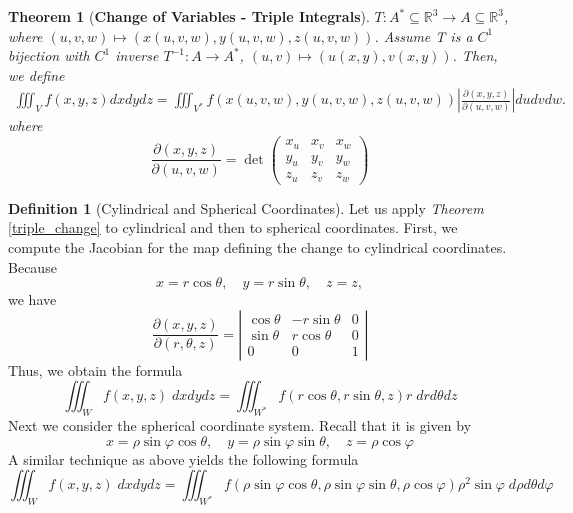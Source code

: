 \documentclass[12pt]{book}
\newtheorem{theorem}{Theorem}[section]
\theoremstyle{definition}
\newtheorem{definition}{Definition}[section]
\theoremstyle{remark}
\begin{document}
  \begin{theorem}[\textbf{Change of Variables - Triple Integrals}] \label{triple_change}
    $T: A^* \subseteq \mathbb{R}^3\to A \subseteq \mathbb{R}^3 $, where $(u,v,w ) \mapsto (x(u,v,w), y(u,v,w), z(u, v,w))$. Assume T is a $C^1$ bijection with $C^1$ inverse $T^{-1}: A \to A^*$, $(u,v) \mapsto (u(x,y), v(x,y))$. Then, we define 
    \begin{equation*}
      \begin{split}
        \iiint_V f(x,y,z) dx dy dz= \iiint_{V^*} f(x(u,v,w) , y(u,v,w), z(u,v,w))\left|\frac{\partial {(x,y,z)}}{\partial {(u,v,w)}} \right| dudvdw.  
      \end{split}
    \end{equation*}
    where $$\frac{\partial {(x,y,z)}}{\partial {(u,v,w)}} = \det \begin{pmatrix}
      x_u &x_v &x_w \\ y_u & y_v &y_w \\ z_u & z_v &z_w
    \end{pmatrix} $$
  \end{theorem}
  \begin{definition}[Cylindrical and Spherical Coordinates]
    
    Let us apply \textit{Theorem} \eqref{triple_change} to cylindrical and then to spherical coordinates. First, we compute the Jacobian for the map defining the change to cylindrical coordinates. Because
    $$x = r \cos \theta, \quad y = r \sin \theta, \quad z =z, $$
    we have 
    $$\frac{\partial {(x,y,z)}}{\partial {(r, \theta, z)}} =\left| \begin{matrix}
      \cos \theta & - r \sin \theta & 0 \\ \sin \theta & r\cos \theta& 0 \\ 0 & 0 & 1
    \end{matrix}  \right|$$
    Thus, we obtain the formula 
    $$\iiint_W f(x,y,z)\; dx dy dz = \iiint_{W^*} f(r \cos \theta, r \sin \theta, z) r \; dr d\theta d z $$
    Next we consider the spherical coordinate system. Recall that it is given by
    $$x =\rho \sin \varphi \cos\theta,\quad y =\rho \sin \varphi \sin \theta, \quad z =\rho \cos \varphi $$
    A similar technique as above yields the following formula 
    $$\iiint_W f(x,y, z) \; dx dy dz = \iiint_{W^*} f(\rho \sin \varphi \cos\theta,\rho \sin \varphi \sin \theta,\rho \cos \varphi) \rho^2 \sin \varphi \; d\rho d \theta d \varphi  $$
  \end{definition}
\end{document}
